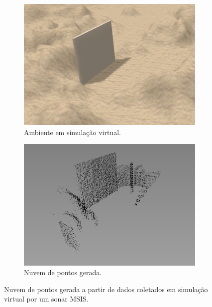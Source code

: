 \begin{figure}[H]
    \centering
    \begin{subfigure}[t]{0.45\textwidth}
        \includegraphics[width=\textwidth]{dados/figuras/scene2.png}
        \caption{Ambiente em simulação virtual.}
        \label{fig:point_cloud_example_a}
    \end{subfigure}
    \begin{subfigure}[t]{0.45\textwidth}
        \includegraphics[width=\textwidth]{dados/figuras/point_cloud.png}
        \caption{Nuvem de pontos gerada.}
        \label{fig:point_cloud_example_b}
    \end{subfigure}
    \caption{Nuvem de pontos gerada a partir de dados coletados em simulação virtual por um sonar MSIS.}
    \label{fig:point_cloud_example}
\end{figure}

